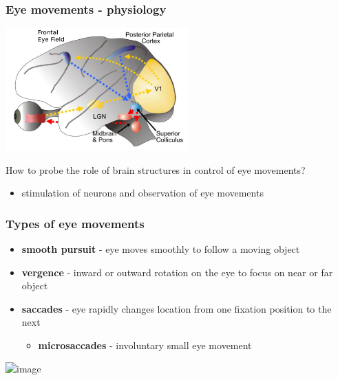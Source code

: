\documentclass[]{beamer}
\begin{document}
\begin{frame}
\frametitle{Eye movements - physiology}
\begin{overlayarea}{110mm}{80mm}
 \begin{center}
\includegraphics[width=70mm]{figs/l7/wurtz_em_brain.png} 
\end{center}

How to probe the role of brain structures in control of eye movements?
\begin{itemize}
 \item<2->[$\rightarrow$] stimulation of neurons and observation of eye movements
\end{itemize}
\end{overlayarea}
\end{frame}


\begin{frame}
\frametitle{Types of eye movements}
\begin{overlayarea}{110mm}{80mm}
 \begin{itemize}
  \item[] \textbf{smooth pursuit} - eye moves smoothly to follow a moving object
  \item[] \textbf{vergence} - inward or outward rotation on the eye to focus on near or far object
  \item[] \textbf{saccades} - eye rapidly changes location from one fixation position to the next
 \begin{itemize}
 \item[] \textbf{microsaccades} - involuntary small eye movement
 \end{itemize}
 \end{itemize}

 \begin{center}
\includegraphics<2->[width=60mm]{figs/l7/classic_scan_path.png} 
\end{center}
\end{overlayarea}
\end{frame}
\end{document}
